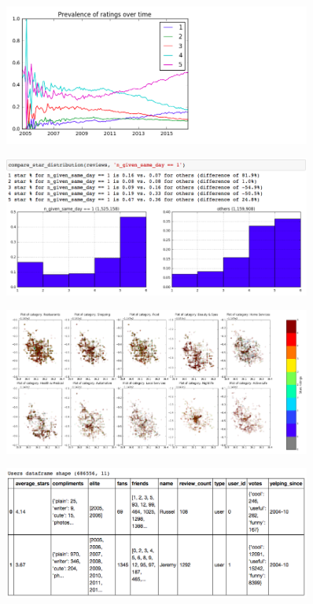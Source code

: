 \documentclass[11pt]{article}
\begin{document}
\begin{figure}[H]
\centering
\includegraphics[width=0.9\textwidth]{./ac209/prevalenceofratingsovertime.png}
\end{figure}

\begin{figure}[H]
\centering
\includegraphics[width=0.9\textwidth]{./ac209/numstarsreviewsperday.png}
\end{figure}

\begin{figure}[H]
\centering
\includegraphics[width=0.9\textwidth]{./ac209/phxstarsbycategorylocation.png}
\end{figure}

\begin{figure}[H]
\centering
\includegraphics[width=0.9\textwidth]{./ac209/userdataframe.png}
\end{figure}
\end{document}
